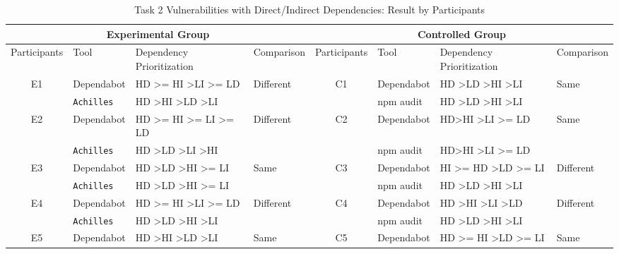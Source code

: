 \documentclass[conference]{IEEEtran}
\begin{document}
	\begin{table}[tb]
		\caption{Task 2 Vulnerabilities with Direct/Indirect Dependencies: Result by Participants}
		\centering
		\begin{tabular}{clll|clll}
			\toprule
			\multicolumn{4}{c|}{Experimental Group} & \multicolumn{4}{c}{Controlled Group}  \\ 
			\midrule
			Participants         & Tool       & Dependency Prioritization & Comparison & Participants & Tool  & Dependency Prioritization & Comparison \\ 
			\midrule
			\multirow{2}{*}{E1}  & Dependabot & HD \textgreater{}= HI \textgreater LI \textgreater{}= LD    & \multirow{2}{*}{Different}      & \multirow{2}{*}{C1} & Dependabot & HD \textgreater LD \textgreater HI \textgreater LI  & \multirow{2}{*}{Same} \\ 
			& \texttt{Achilles}   & HD \textgreater HI \textgreater LD \textgreater LI & & & npm audit & HD \textgreater LD \textgreater HI \textgreater LI & \\ 
			\midrule
			\multirow{2}{*}{E2}  & Dependabot & HD \textgreater{}= HI \textgreater{}= LI \textgreater{}= LD & \multirow{2}{*}{Different}      & \multirow{2}{*}{C2} & Dependabot & HD\textgreater HI \textgreater LI \textgreater = LD &  \multirow{2}{*}{Same} \\
			& \texttt{Achilles}   & HD \textgreater LD \textgreater LI \textgreater HI & & & npm audit & HD\textgreater HI \textgreater LI \textgreater = LD &  \\ 
			\midrule
			\multirow{2}{*}{E3}  & Dependabot & HD \textgreater LD \textgreater HI \textgreater{}= LI & \multirow{2}{*}{Same} & \multirow{2}{*}{C3} & Dependabot & HI \textgreater{}= HD \textgreater LD \textgreater{}= LI &  \multirow{2}{*}{Different} \\ 
			& \texttt{Achilles}   & HD \textgreater LD \textgreater HI \textgreater{}= LI & & & npm audit & HD \textgreater LD \textgreater HI \textgreater LI  & \\ 
			\midrule
			\multirow{2}{*}{E4}  & Dependabot & HD \textgreater{}= HI \textgreater LI \textgreater{}= LD    & \multirow{2}{*}{Different}      & \multirow{2}{*}{C4} & Dependabot & HD \textgreater HI \textgreater LI \textgreater LD & \multirow{2}{*}{Different} \\ 
			& \texttt{Achilles}   & HD \textgreater LD \textgreater HI \textgreater LI & & & npm audit &  HD \textgreater LD \textgreater HI \textgreater LI & \\ 
			\midrule
			\multirow{2}{*}{E5}  & Dependabot & HD \textgreater HI \textgreater LD \textgreater LI          & \multirow{2}{*}{Same}           & \multirow{2}{*}{C5} & Dependabot & HD \textgreater{}= HI \textgreater LD \textgreater{}= LI & \multirow{2}{*}{Same} \\ 

\end{tabular}
\end{table}
\end{document}
